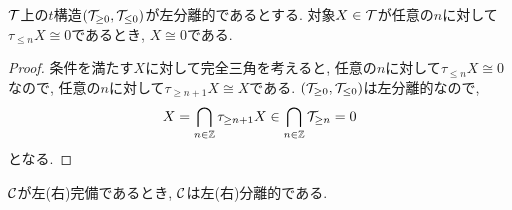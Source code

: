 \documentclass[uplatex, a4paper, 14Q, dvipdfmx]{jsarticle}
\begin{document}
\begin{lemma}
  $\mathcal{T}$上の$t$構造$(\mathcal{T}_{\geq 0}, \mathcal{T}_{\leq 0})$が左分離的であるとする. 
  対象$X \in \mathcal{T}$が任意の$n$に対して$\tau_{\leq n}X \cong 0$であるとき, $X \cong 0$である.   
\end{lemma}

\begin{proof}
  条件を満たす$X$に対して完全三角を考えると, 任意の$n$に対して$\tau_{\leq n}X \cong 0$なので, 任意の$n$に対して$\tau_{\geq n+1}X \cong X$である. 
  $(\mathcal{T}_{\geq 0}, \mathcal{T}_{\leq 0})$は左分離的なので, 
  \begin{align*}
    X = \bigcap_{n \in \mathbb{Z}} \tau_{\geq n+1}X \in \bigcap_{n \in \mathbb{Z}} \mathcal{T}_{\geq n} = 0
  \end{align*}
  となる. 
\end{proof}

\begin{lemma}
  $\mathcal{C}$が左(右)完備であるとき, $\mathcal{C}$は左(右)分離的である. 
\end{lemma}
\end{document}
